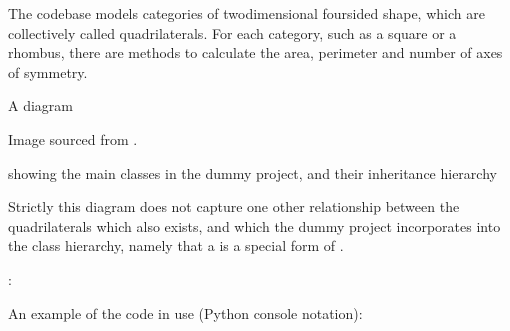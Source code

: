 \documentclass[letterpaper,10pt,english]{sphinxmanual}
\begin{document}
The codebase models categories of two\sphinxhyphen{}dimensional four\sphinxhyphen{}sided shape, which
are collectively called quadrilaterals. For each category, such as a
square or a rhombus, there are methods to calculate the area, perimeter and
number of axes of symmetry.

A diagram %
\begin{footnote}[1]\sphinxAtStartFootnote
Image sourced from .
%
\end{footnote} showing the main classes in the dummy project, and
their inheritance hierarchy %
\begin{footnote}[2]\sphinxAtStartFootnote
Strictly this diagram does not capture one other
relationship between the quadrilaterals which also exists, and which the
dummy project incorporates into the class hierarchy, namely that a
 is a special form of .
%
\end{footnote} :

\noindent{}

An example of the code in use (Python console notation):
\end{document}
